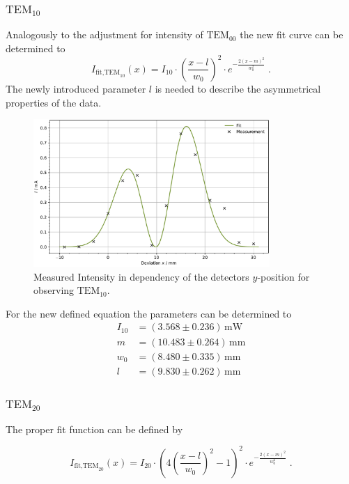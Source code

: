 \subsubsection{$\text{TEM}_{10}$}

Analogously to the adjustment for intensity of $\text{TEM}_{00}$ the new fit curve can be determined to 
\begin{equation*}
    I_{\text{fit,TEM}_{10}}(x) = I_{10} \cdot \left( \frac{x - l}{w_0} \right)^2 \cdot e^{-\frac{2(x - m)^2}{w_0^2}}\; .
\end{equation*}
The newly introduced parameter $l$ is needed to describe the asymmetrical properties of the data.
\begin{figure}
	\centering
	\includegraphics[width=0.8\textwidth]{content/plots/TEM01.pdf}
	\caption{Measured Intensity in dependency of the detectors $y$-position for observing $\text{TEM}_{10}$.}
	\label{fig:TEM01}
\end{figure}
For the new defined equation the parameters can be determined to 
\begin{align*}
I_{10} &= \left( 3.568 \pm 0.236 \right) \, \text{mW} \\
m &= \left( 10.483 \pm 0.264 \right) \, \text{mm} \\
w_0 &= \left( 8.480 \pm 0.335 \right) \, \text{mm} \\
l &= \left( 9.830 \pm 0.262 \right) \, \text{mm}
\end{align*}

\subsubsection{$\text{TEM}_{20}$}
The proper fit function can be defined by 

\begin{equation*}
    I_{\text{fit,TEM}_{20}}(x)  = I_{20} \cdot \left( 4 \left( \frac{x - l}{w_0} \right)^2 - 1 \right)^2 \cdot e^{-\frac{2(x - m)^2}{w_0^2}}\; .
\end{equation*}

